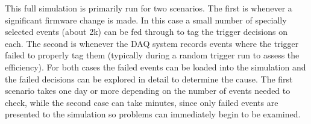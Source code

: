 This full simulation is primarily run for two scenarios. The first is whenever a significant firmware change is
made. In this case a small number of specially selected events (about 2k) can be fed through to tag the trigger
decisions on each. The second is whenever the DAQ system records events where the trigger failed to properly
tag them (typically during a random trigger run to assess the efficiency). For both cases the failed events can
be loaded into the simulation and the failed decisions can be explored in detail to determine the cause. The first
scenario takes one day or more depending on the number of events needed to check, while the second case can
take minutes, since only failed events are presented to the simulation so problems can immediately begin to be
examined.
